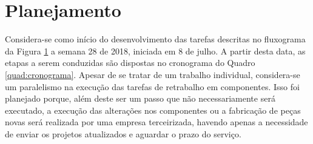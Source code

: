 \documentclass[12pt,openright,oneside,a4paper,
	chapter=TITLE,section=TITLE,
	english,brazil]{abntex2}
\begin{document}
	\begin{figure}[h]
		\label{fig:fluxograma}
	\end{figure}
	\clearpage
	
	\section{Planejamento}
	Considera-se como início do desenvolvimento das tarefas descritas no fluxograma da Figura \ref{fig:fluxograma} a semana 28 de 2018, iniciada em 8 de julho. A partir desta data, as etapas a serem conduzidas são dispostas no cronograma do Quadro \ref{quad:cronograma}. Apesar de se tratar de um trabalho individual, considera-se um paralelismo na execução das tarefas de retrabalho em componentes. Isso foi planejado porque, além deste ser um passo que não necessariamente será executado, a execução das alterações nos componentes ou a fabricação de peças novas será realizada por uma empresa terceirizada, havendo apenas a necessidade de enviar os projetos atualizados e aguardar o prazo do serviço.
	
	\begin{quadro}[h]
		\label{quad:cronograma}
	\end{quadro}
	
	\postextual
	
	
		
\end{document}
